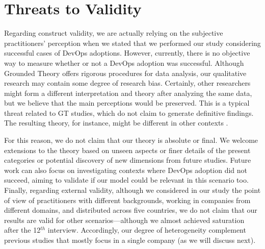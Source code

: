 \section{Threats to Validity}

Regarding construct validity,  we are actually relying on the subjective
practitioners' perception when we stated that we performed our study considering successful cases
of DevOps adoptions. However, currently, there is no objective way to measure whether or not a
DevOps adoption was successful.
Although Grounded Theory offers rigorous procedures for data analysis, our
qualitative research may contain some degree of research bias. Certainly, other
researchers might form a different interpretation and theory after analyzing
the same data, but we believe that the main perceptions would be preserved.
This is a typical threat related to GT studies, which do not claim to generate
definitive findings. The resulting theory, for instance, might
be different in other contexts \cite{hoda2012developing}.

For this reason, we do not claim
that our theory is absolute or final. We welcome extensions to the theory based
on unseen aspects or finer details of the present categories or potential discovery
of new dimensions from future studies.
Future work can also focus on investigating contexts
where DevOps adoption did not succeed, aiming to validate if our model could be
relevant in this scenario too. Finally, regarding external validity, although we
considered in our study the point of view of practitioners with different
backgrounds, working in companies from different domains, and distributed across
five countries, we do not claim that our results are valid for
other scenarios---although we almost achieved saturation
after the 12$^{th}$ interview. Accordingly, our degree of heterogeneity complement
previous studies that mostly focus in a single company (as we will discuss next).
